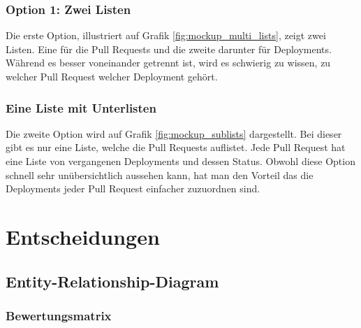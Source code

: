 \subsubsection{Option 1: Zwei Listen}
Die erste Option, illustriert auf Grafik \ref{fig:mockup_multi_lists}, zeigt zwei Listen. Eine für die Pull Requests und
die zweite darunter für Deployments. \newline
Während es besser voneinander getrennt ist, wird es schwierig zu wissen, zu welcher Pull Request welcher Deployment
gehört. \newline

\subsubsection{Eine Liste mit Unterlisten}
Die zweite Option wird auf Grafik \ref{fig:mockup_sublists} dargestellt. Bei dieser gibt es nur eine Liste, welche
die Pull Requests auflistet. Jede Pull Request hat eine Liste von vergangenen Deployments und dessen Status. \newline
Obwohl diese Option schnell sehr unübersichtlich aussehen kann, hat man den Vorteil das die Deployments jeder
Pull Request einfacher zuzuordnen sind. \newline

\section{Entscheidungen}
\subsection{Entity-Relationship-Diagram}
\label{sec:decide_erd}
\subsubsection{Bewertungsmatrix}
\begin{center}
\end{center}
